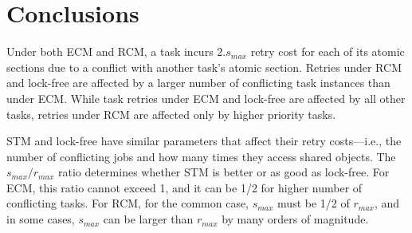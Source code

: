 \documentclass[12pt,english]{report}
\begin{document}

\section{Conclusions}
\label{sec:ecm-rcm-conclusions}

Under both ECM and RCM,  
a task incurs $2.s_{max}$ retry cost for each of its atomic sections due to a conflict with another task's atomic section. Retries under RCM and lock-free are affected by a larger number of conflicting task instances than under ECM. While task retries under ECM and lock-free are affected by all other tasks, retries under RCM are affected only by higher priority tasks. 


STM and lock-free have similar parameters that affect their retry costs---i.e., the number of conflicting jobs and how many times they access shared objects. The $s_{max}/r_{max}$ ratio determines whether STM is better or as good as lock-free. For ECM, this ratio cannot exceed 1, and it can be 1/2 for higher number of conflicting tasks. For RCM, for the common case, $s_{max}$ must be 1/2 of $r_{max}$, and in some cases, $s_{max}$ can be larger than $r_{max}$ by many orders of magnitude.
\end{document}
